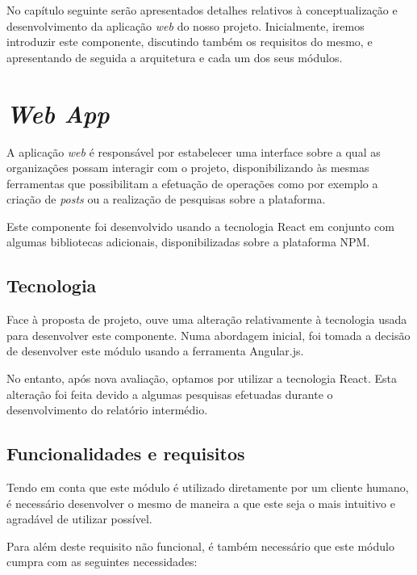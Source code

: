 No capítulo seguinte serão apresentados detalhes relativos à conceptualização e desenvolvimento da aplicação \textit{web} do nosso projeto. Inicialmente, iremos introduzir este componente, discutindo também os requisitos do mesmo, e apresentando de seguida a arquitetura e cada um dos seus módulos.

\section{\textit{Web App}}

A aplicação \textit{web} é responsável por estabelecer uma interface sobre a qual as organizações possam interagir com o projeto, disponibilizando às mesmas ferramentas que possibilitam a efetuação de operações como por exemplo a criação de \textit{posts} ou a realização de pesquisas sobre a plataforma.

\par \medskip

Este componente foi desenvolvido usando a tecnologia React em conjunto com algumas bibliotecas adicionais, disponibilizadas sobre a plataforma NPM.

\subsection{Tecnologia}

Face à proposta de projeto, ouve uma alteração relativamente à tecnologia usada para desenvolver este componente. Numa abordagem inicial, foi tomada a decisão de desenvolver este módulo usando a ferramenta Angular.js. \par \medskip

No entanto, após nova avaliação, optamos por utilizar a tecnologia React. Esta alteração foi feita devido a algumas pesquisas efetuadas durante o desenvolvimento do relatório intermédio. \par \medskip

\subsection{Funcionalidades e requisitos}

Tendo em conta que este módulo é utilizado diretamente por um cliente humano, é necessário desenvolver o mesmo de maneira a que este seja o mais intuitivo e agradável de utilizar possível. 

\par \medskip

Para além deste requisito não funcional, é também necessário que este módulo cumpra com as seguintes necessidades:

